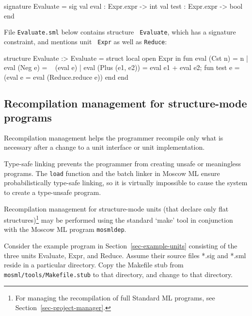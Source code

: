 \documentclass[fleqn,a4paper]{article}
\begin{document}
\begin{program}
signature Evaluate = sig
   val eval : Expr.expr -> int
   val test : Expr.expr -> bool
end
\end{program}

\noindent File {\tt Evaluate.sml} below contains structure {\tt
  Evaluate}, which has a signature constraint, and mentions unit {\tt
  Expr} as well as {\tt Reduce}:

\begin{program}
structure Evaluate :> Evaluate = struct
   local open Expr 
   in 
       fun eval (Cst n)         = n
         | eval (Neg e)         = ~ (eval e)
         | eval (Plus (e1, e2)) = eval e1 + eval e2;
       fun test e = (eval e = eval (Reduce.reduce e))
   end
end
\end{program}


\subsection{Recompilation management for structure-mode programs}
\label{sec-structure-mode-recompilation}

Recompilation management helps the programmer recompile only what is
necessary after a change to a unit interface or unit implementation.  

Type-safe linking prevents the programmer from creating unsafe or
meaningless programs.  The {\tt load} function and the batch linker in
Moscow ML ensure probabilistically type-safe linking, so it is
virtually impossible to cause the system to create a type-unsafe
program.

Recompilation management for structure-mode units (that declare only
flat structures)\footnote{For managing the recompilation of full
  Standard ML programs, see Section~\ref{sec-project-manager}.} may be
performed using the standard `make' tool in conjunction with the
Moscow ML program \texttt{mosmldep}.

Consider the example program in Section~\ref{sec-example-units}
consisting of the three units Evaluate, Expr, and Reduce.  Assume
their source files *.sig and *.sml reside in a particular directory.
Copy the Makefile stub from \texttt{mosml/tools/Makefile.stub} to that
directory, and change to that directory.
\end{document}
